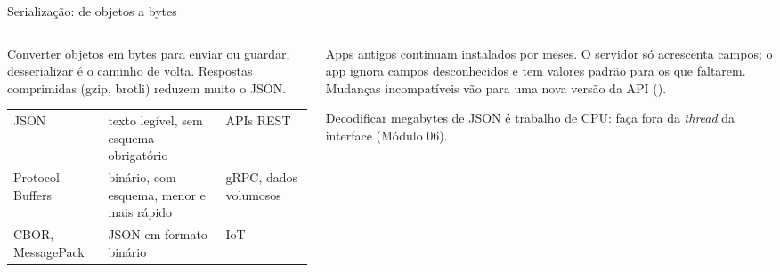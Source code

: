 \begin{frame}{Serialização: de objetos a bytes}
  \begin{columns}[T]
    \begin{column}{0.52\textwidth}
      \begin{definicao}[Serialização]
        Converter objetos em bytes para enviar ou guardar; desserializar é o caminho de volta. Respostas comprimidas (gzip, brotli) reduzem muito o JSON.
      \end{definicao}
      \scriptsize
      \begin{tabularx}{\linewidth}{@{}l L L@{}}
        \toprule
         &  &  \\
        \midrule
        JSON & texto legível, sem esquema obrigatório & APIs REST \\
        Protocol Buffers & binário, com esquema, menor e mais rápido & gRPC, dados volumosos \\
        CBOR, MessagePack & JSON em formato binário & IoT \\
        \bottomrule
      \end{tabularx}
      \normalsize
    \end{column}
    \begin{column}{0.46\textwidth}
      \begin{conceito}
        Apps antigos continuam instalados por meses. O servidor só acrescenta campos; o app ignora campos desconhecidos e tem valores padrão para os que faltarem. Mudanças incompatíveis vão para uma nova versão da API ().
      \end{conceito}
      \begin{atencao}
        Decodificar megabytes de JSON é trabalho de CPU: faça fora da \emph{thread} da interface (Módulo 06).
      \end{atencao}
    \end{column}
  \end{columns}
\end{frame}

